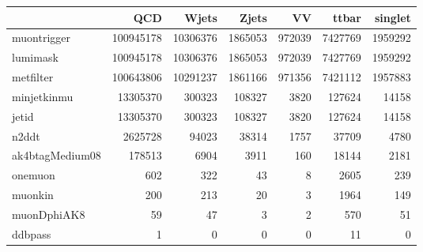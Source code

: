 \begin{tabular}{lrrrrrr}
\toprule
 & QCD & Wjets & Zjets & VV & ttbar & singlet \\
\midrule
muontrigger & 100945178 & 10306376 & 1865053 & 972039 & 7427769 & 1959292 \\
lumimask & 100945178 & 10306376 & 1865053 & 972039 & 7427769 & 1959292 \\
metfilter & 100643806 & 10291237 & 1861166 & 971356 & 7421112 & 1957883 \\
minjetkinmu & 13305370 & 300323 & 108327 & 3820 & 127624 & 14158 \\
jetid & 13305370 & 300323 & 108327 & 3820 & 127624 & 14158 \\
n2ddt & 2625728 & 94023 & 38314 & 1757 & 37709 & 4780 \\
ak4btagMedium08 & 178513 & 6904 & 3911 & 160 & 18144 & 2181 \\
onemuon & 602 & 322 & 43 & 8 & 2605 & 239 \\
muonkin & 200 & 213 & 20 & 3 & 1964 & 149 \\
muonDphiAK8 & 59 & 47 & 3 & 2 & 570 & 51 \\
ddbpass & 1 & 0 & 0 & 0 & 11 & 0 \\
\bottomrule
\end{tabular}
